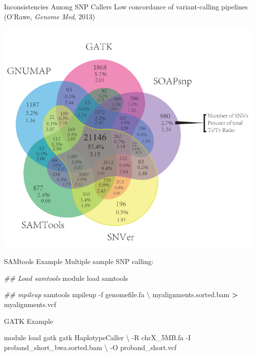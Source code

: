 \documentclass[
  ignorenonframetext,
]{beamer}
\newenvironment{Shaded}{\begin{snugshade}}{\end{snugshade}}
\newcommand{\AttributeTok}[1]{\textcolor[rgb]{0.13,0.29,0.53}{#1}}
\newcommand{\CommentTok}[1]{\textcolor[rgb]{0.56,0.35,0.01}{\textit{#1}}}
\newcommand{\DataTypeTok}[1]{\textcolor[rgb]{0.13,0.29,0.53}{#1}}
\newcommand{\ExtensionTok}[1]{#1}
\newcommand{\NormalTok}[1]{#1}
\newcommand{\OperatorTok}[1]{\textcolor[rgb]{0.81,0.36,0.00}{\textbf{#1}}}
\begin{document}
\begin{frame}{Inconsistencies Among SNP Callers}
\label{inconsistencies-among-snp-callers}
Low concordance of variant-calling pipelines (O'Rawe, \emph{Genome Med},
2013)

\center

\includegraphics[width=\textwidth,height=0.8\textheight]{figs/discordance.png}
\end{frame}

\begin{frame}[fragile]{SAMtools Example}
\label{samtools-example}
Multiple sample SNP calling:

\begin{Shaded}
\begin{Highlighting}[]
\CommentTok{\#\# Load samtools}
\ExtensionTok{module}\NormalTok{ load samtools}

\CommentTok{\#\# mpileup}
\ExtensionTok{samtools}\NormalTok{ mpileup }\AttributeTok{{-}f}\NormalTok{ genomefile.fa }\DataTypeTok{\textbackslash{} }
  \ExtensionTok{myalignments.sorted.bam} \OperatorTok{\textgreater{}}\NormalTok{ myalignments.vcf}
\end{Highlighting}
\end{Shaded}
\end{frame}

\begin{frame}[fragile]{GATK Example}
\label{gatk-example}
\begin{Shaded}
\begin{Highlighting}[]
\ExtensionTok{module}\NormalTok{ load gatk}
\ExtensionTok{gatk}\NormalTok{ HaplotypeCaller }\DataTypeTok{\textbackslash{}}
    \AttributeTok{{-}R}\NormalTok{ chrX\_5MB.fa }\AttributeTok{{-}I}\NormalTok{ proband\_short\_bwa.sorted.bam }\DataTypeTok{\textbackslash{}}
    \AttributeTok{{-}O}\NormalTok{ proband\_short.vcf}
\end{Highlighting}
\end{Shaded}
\end{frame}
\end{document}

